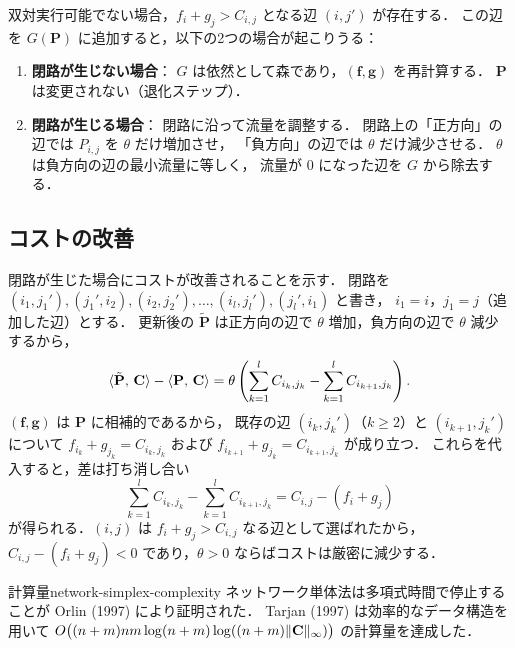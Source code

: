 双対実行可能でない場合，$f_i + g_j > C_{i,j}$ となる辺 $(i, j')$ が存在する．
この辺を $G(\mathbf{P})$ に追加すると，以下の2つの場合が起こりうる：

\begin{enumerate}
  \item \textbf{閉路が生じない場合}：
    $G$ は依然として森であり，$(\mathbf{f}, \mathbf{g})$ を再計算する．
    $\mathbf{P}$ は変更されない（退化ステップ）．
  \item \textbf{閉路が生じる場合}：
    閉路に沿って流量を調整する．
    閉路上の「正方向」の辺では $P_{i,j}$ を $\theta$ だけ増加させ，
    「負方向」の辺では $\theta$ だけ減少させる．
    $\theta$ は負方向の辺の最小流量に等しく，
    流量が $0$ になった辺を $G$ から除去する．
\end{enumerate}

\subsection{コストの改善}

閉路が生じた場合にコストが改善されることを示す．
閉路を $(i_1, j_1'), (j_1', i_2), (i_2, j_2'), \ldots, (i_l, j_l'), (j_l', i_1)$ と書き，
$i_1 = i$，$j_1 = j$（追加した辺）とする．
更新後の $\tilde{\mathbf{P}}$ は正方向の辺で $\theta$ 増加，負方向の辺で $\theta$ 減少するから，
\[
  \langle \tilde{\mathbf{P}},\, \mathbf{C} \rangle - \langle \mathbf{P},\, \mathbf{C} \rangle
  = \theta \left( \sum_{k=1}^l C_{i_k, j_k} - \sum_{k=1}^l C_{i_{k+1}, j_k} \right).
\]
$(\mathbf{f}, \mathbf{g})$ は $\mathbf{P}$ に相補的であるから，
既存の辺 $(i_k, j_k')$（$k \geq 2$）と $(i_{k+1}, j_k')$ について
$f_{i_k} + g_{j_k} = C_{i_k, j_k}$ および $f_{i_{k+1}} + g_{j_k} = C_{i_{k+1}, j_k}$ が成り立つ．
これらを代入すると，差は打ち消し合い
\[
  \sum_{k=1}^l C_{i_k, j_k} - \sum_{k=1}^l C_{i_{k+1}, j_k} = C_{i,j} - (f_i + g_j)
\]
が得られる．$(i, j)$ は $f_i + g_j > C_{i,j}$ なる辺として選ばれたから，
$C_{i,j} - (f_i + g_j) < 0$ であり，$\theta > 0$ ならばコストは厳密に減少する．

\begin{remark}{計算量}{network-simplex-complexity}
  ネットワーク単体法は多項式時間で停止することが Orlin (1997) により証明された．
  Tarjan (1997) は効率的なデータ構造を用いて
  $O\bigl((n+m)nm \log(n+m) \log((n+m)\lVert \mathbf{C} \rVert_\infty)\bigr)$
  の計算量を達成した．
\end{remark}

